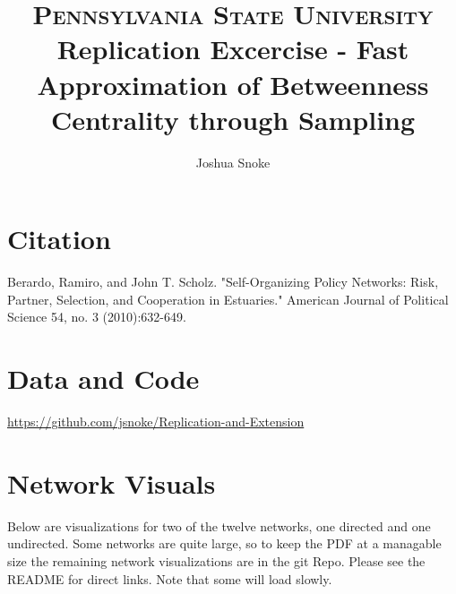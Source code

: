 \documentclass[12pt]{article} %
\title{
		\usefont{OT1}{bch}{b}{n}
		\normalfont \normalsize \textsc{Pennsylvania State University} \\ [25pt]
		\Large Replication Excercise - Fast Approximation of Betweenness Centrality through Sampling \\
}
\author{
		\normalfont 								\normalsize
        Joshua Snoke \\[-2pt]		\normalsize
}
\date{}
\numberwithin{equation}{section}		%
\numberwithin{figure}{section}			%
\numberwithin{table}{section}				%
\begin{document}
\maketitle

\section*{Citation}
Berardo, Ramiro, and John T. Scholz. "Self-Organizing Policy Networks: Risk, Partner, Selection, and Cooperation in Estuaries." American Journal of Political Science 54, no. 3 (2010):632-649.

\section*{Data and Code}
\url{https://github.com/jsnoke/Replication-and-Extension}

\section*{Network Visuals}
Below are visualizations for two of the twelve networks, one directed and one undirected. Some networks are quite large, so to keep the PDF at a managable size the remaining network visualizations are in the git Repo. Please see the README for direct links. Note that some will load slowly.

\begin{comment}
\begin{figure}[!ht]
      \texttt{[image: ../visuals/wikiPlot.pdf]}
      \caption{Wikipedia who-votes-on-whom network}\label{fig:x1}
\end{figure}
\end{comment}
\end{document}
